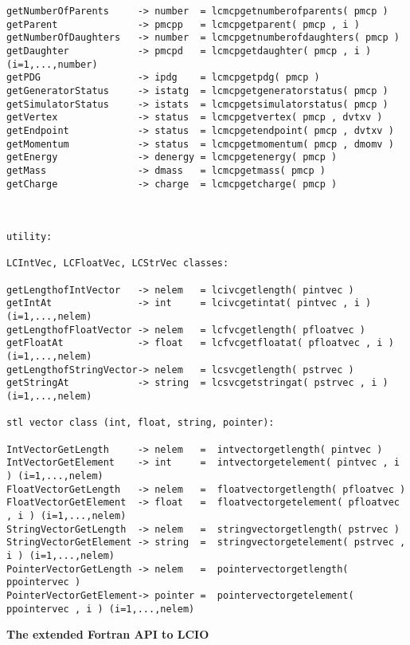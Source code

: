 \begin{scriptsize}
\begin{verbatim}
getNumberOfParents     -> number  = lcmcpgetnumberofparents( pmcp )
getParent              -> pmcpp   = lcmcpgetparent( pmcp , i )
getNumberOfDaughters   -> number  = lcmcpgetnumberofdaughters( pmcp )
getDaughter            -> pmcpd   = lcmcpgetdaughter( pmcp , i )  (i=1,...,number)
getPDG                 -> ipdg    = lcmcpgetpdg( pmcp )
getGeneratorStatus     -> istatg  = lcmcpgetgeneratorstatus( pmcp )
getSimulatorStatus     -> istats  = lcmcpgetsimulatorstatus( pmcp )
getVertex              -> status  = lcmcpgetvertex( pmcp , dvtxv )
getEndpoint            -> status  = lcmcpgetendpoint( pmcp , dvtxv )
getMomentum            -> status  = lcmcpgetmomentum( pmcp , dmomv )
getEnergy              -> denergy = lcmcpgetenergy( pmcp )
getMass                -> dmass   = lcmcpgetmass( pmcp )
getCharge              -> charge  = lcmcpgetcharge( pmcp )



utility: 

LCIntVec, LCFloatVec, LCStrVec classes:

getLengthofIntVector   -> nelem   = lcivcgetlength( pintvec )
getIntAt               -> int     = lcivcgetintat( pintvec , i ) (i=1,...,nelem)
getLengthofFloatVector -> nelem   = lcfvcgetlength( pfloatvec )
getFloatAt             -> float   = lcfvcgetfloatat( pfloatvec , i ) (i=1,...,nelem)
getLengthofStringVector-> nelem   = lcsvcgetlength( pstrvec )
getStringAt            -> string  = lcsvcgetstringat( pstrvec , i ) (i=1,...,nelem)

stl vector class (int, float, string, pointer):

IntVectorGetLength     -> nelem   =  intvectorgetlength( pintvec )
IntVectorGetElement    -> int     =  intvectorgetelement( pintvec , i ) (i=1,...,nelem)
FloatVectorGetLength   -> nelem   =  floatvectorgetlength( pfloatvec )
FloatVectorGetElement  -> float   =  floatvectorgetelement( pfloatvec , i ) (i=1,...,nelem)
StringVectorGetLength  -> nelem   =  stringvectorgetlength( pstrvec )
StringVectorGetElement -> string  =  stringvectorgetelement( pstrvec , i ) (i=1,...,nelem)
PointerVectorGetLength -> nelem   =  pointervectorgetlength( ppointervec )
PointerVectorGetElement-> pointer =  pointervectorgetelement( ppointervec , i ) (i=1,...,nelem)

\end{verbatim}

\end{scriptsize}



\newpage
{\large\bf The extended Fortran API to LCIO} \\


